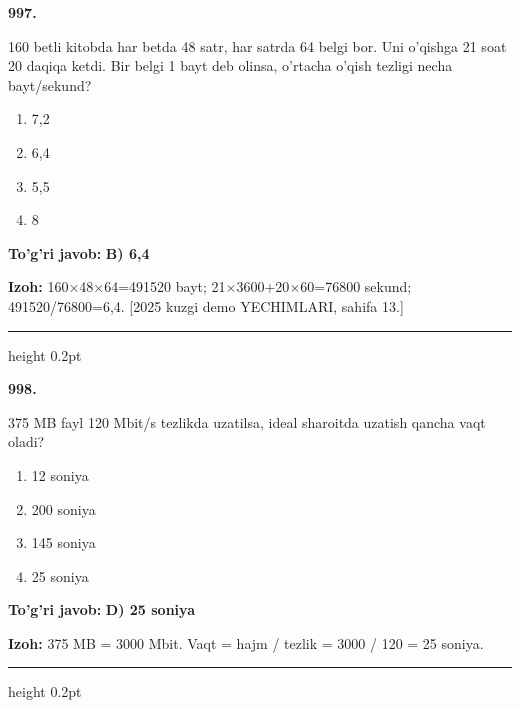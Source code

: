\documentclass[10pt,a4paper,oneside]{article}
\begin{document}
\noindent\textbf{\color{ink}997.}
\par
160 betli kitobda har betda 48 satr, har satrda 64 belgi bor. Uni o'qishga 21 soat 20 daqiqa ketdi. Bir belgi 1 bayt deb olinsa, o'rtacha o'qish tezligi necha bayt/sekund?
\begin{enumerate}[label=\Alph*),leftmargin=9mm]
\item 7,2
\item 6,4
\item 5,5
\item 8
\end{enumerate}
\begin{tcolorbox}[enhanced,breakable,colback=teal!4,colframe=teal!50!black,boxrule=0.5pt,arc=1.1mm,left=3mm,right=3mm,top=1.7mm,bottom=1.7mm,before skip=2mm,after skip=2mm]
\textbf{\color{teal}To'g'ri javob:} \textbf{B) 6,4}
\par\smallskip
\textbf{Izoh:} 160\ensuremath{\times}48\ensuremath{\times}64=491520 bayt; 21\ensuremath{\times}3600+20\ensuremath{\times}60=76800 sekund; 491520/76800=6,4. [2025 kuzgi demo YECHIMLARI, sahifa 13.]
\end{tcolorbox}
\vspace{2mm}\hrule height 0.2pt \vspace{3mm}

\noindent\textbf{\color{ink}998.}
\par
375 MB fayl 120 Mbit/s tezlikda uzatilsa, ideal sharoitda uzatish qancha vaqt oladi?
\begin{enumerate}[label=\Alph*),leftmargin=9mm]
\item 12 soniya
\item 200 soniya
\item 145 soniya
\item 25 soniya
\end{enumerate}
\begin{tcolorbox}[enhanced,breakable,colback=teal!4,colframe=teal!50!black,boxrule=0.5pt,arc=1.1mm,left=3mm,right=3mm,top=1.7mm,bottom=1.7mm,before skip=2mm,after skip=2mm]
\textbf{\color{teal}To'g'ri javob:} \textbf{D) 25 soniya}
\par\smallskip
\textbf{Izoh:} 375 MB = 3000 Mbit. Vaqt = hajm / tezlik = 3000 / 120 = 25 soniya.
\end{tcolorbox}
\vspace{2mm}\hrule height 0.2pt \vspace{3mm}
\end{document}
